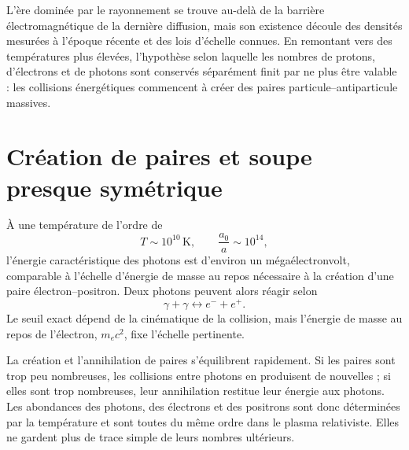 L’ère dominée par le rayonnement se trouve au-delà de la barrière électromagnétique de la dernière diffusion, mais son existence découle des densités mesurées à l’époque récente et des lois d’échelle connues. En remontant vers des températures plus élevées, l’hypothèse selon laquelle les nombres de protons, d’électrons et de photons sont conservés séparément finit par ne plus être valable : les collisions énergétiques commencent à créer des paires particule--antiparticule massives.

\begin{classroomqa}
\end{classroomqa}

\section{Création de paires et soupe presque symétrique}

À une température de l’ordre de
\begin{equation}
T\sim10^{10}\,\mathrm{K},
\qquad
\frac{a_0}{a}\sim10^{14},
\end{equation}
l’énergie caractéristique des photons est d’environ un mégaélectronvolt, comparable à l’échelle d’énergie de masse au repos nécessaire à la création d’une paire électron--positron. Deux photons peuvent alors réagir selon
\begin{equation}
\gamma+\gamma
\longleftrightarrow
e^-+e^+.
\label{eq:c07-pair-reaction}
\end{equation}
Le seuil exact dépend de la cinématique de la collision, mais l’énergie de masse au repos de l’électron, \(m_ec^2\), fixe l’échelle pertinente.

La création et l’annihilation de paires s’équilibrent rapidement. Si les paires sont trop peu nombreuses, les collisions entre photons en produisent de nouvelles ; si elles sont trop nombreuses, leur annihilation restitue leur énergie aux photons. Les abondances des photons, des électrons et des positrons sont donc déterminées par la température et sont toutes du même ordre dans le plasma relativiste. Elles ne gardent plus de trace simple de leurs nombres ultérieurs.


